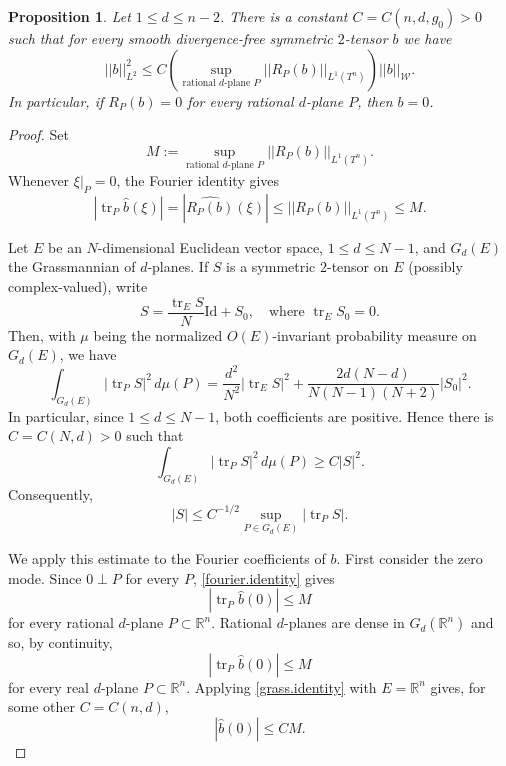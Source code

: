 \documentclass[11pt]{amsart}
\def\R{\mathbb R}
\def\tr{\operatorname{tr}}
\newtheorem{prop}[thm]{Proposition}
\theoremstyle{remark}
\theoremstyle{definition}
\begin{document}
	\begin{prop}\label{injectivity.estimate}
		Let $1\leq d\leq n-2$. There is a constant $C=C(n,d,g_0)>0$ such that for every smooth divergence-free symmetric $2$-tensor $b$ we have
		$$
		||b||_{L^2}^2\leq C\left(\sup_{\text{rational }d\text{-plane }P}||R_P(b)||_{L^1(T^n)}\right)||b||_{\mathcal W}.
		$$
		In particular, if $R_P(b)=0$ for every rational $d$-plane $P$, then $b=0$.
	\end{prop}
	\begin{proof}
		{Set}
		$$
		M:=\sup_{\text{rational }d\text{-plane }P}||R_P(b)||_{L^1(T^n)}.
		$$
		Whenever $\xi|_P=0$, the Fourier identity gives
		\begin{equation}\label{fourier.identity}
			|\tr _P\widehat b(\xi)|
			=
			|\widehat{R_P(b)}(\xi)|
			\leq
			||R_P(b)||_{L^1(T^n)}
			\leq M.
		\end{equation}
		
		Let $E$ be an $N$-dimensional Euclidean vector space,  $1\leq d\leq N-1$, and $G_d(E)$ the Grassmannian of $d$-planes. If $S$ is a  symmetric $2$-tensor on $E$ (possibly complex-valued), write
		$$
		S=\frac{\tr _E S}{N}\text{Id}+S_0,  \quad\text{where } \tr _E S_0=0.
		$$
		Then, with $\mu$ being the normalized $O(E)$-invariant probability measure on $G_d(E)$, we have \cite[Theorem~2.4]{bodmann-ehler-graf}
		\begin{equation}\label{integration.formula}
			\int_{G_d(E)}
			|\tr _P S|^2\,d\mu(P)
			=
			\frac{d^2}{N^2}|\tr _E S|^2
			+
			\frac{2d(N-d)}{N(N-1)(N+2)}|S_0|^2.
		\end{equation}
		In particular, since $1\leq d\leq N-1$, both coefficients are positive. Hence there is $C=C(N,d)>0$ such that
		\begin{equation}\label{integration.grass}
			\int_{G_d(E)}
			|\tr _P S|^2\,d\mu(P)
			\geq
			C|S|^2.
		\end{equation}
		Consequently,
		\begin{equation}\label{grass.identity}
			|S|
			\leq
			C^{-1/2}
			\sup_{P\in G_d(E)}|\tr _P S|.
		\end{equation}
		
		We apply this estimate to the Fourier coefficients of $b$. First consider the zero mode. Since $0\perp P$ for every $P$, \eqref{fourier.identity} gives
		$$
		|\tr _P\widehat b(0)|\leq M
		$$
		for every rational $d$-plane $P\subset\R^n$. Rational $d$-planes are dense in $G_d(\R^n)$ and  so, by continuity,
		$$
		|\tr _P\widehat b(0)|\leq M
		$$
		for every real $d$-plane $P\subset\R^n$. Applying \eqref{grass.identity} with $E=\R^n$ gives, for some other $C=C(n,d)$,
		$$
		|\widehat b(0)|\leq C M.
		$$
		

\end{proof}
\end{document}
